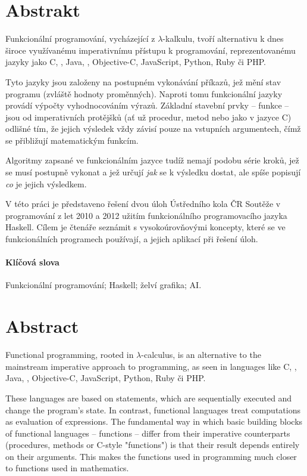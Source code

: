 \begin{adjustwidth}{1.5cm}{1.5cm}


\section*{Abstrakt}

Funkcionální programování, vycházející z $\lambda$-kalkulu, tvoří alternativu k
dnes široce využívanému imperativnímu přístupu k programování, reprezentovanému
jazyky jako C, \Cplusplus{}, Java, \Csh{}, Objective-C, JavaScript, Python, Ruby
či PHP.

Tyto jazyky jsou založeny na postupném vykonávání příkazů, jež mění stav
programu (zvláště hodnoty proměnných). Naproti tomu funkcionální jazyky provádí
výpočty vyhodnocováním výrazů. Základní stavební prvky -- funkce -- jsou od
imperativních protějšků (ať už procedur, metod nebo  jako v jazyce C)
odlišné tím, že jejich výsledek vždy závisí pouze na vstupních argumentech, čímž
se přibližují matematickým funkcím.

Algoritmy zapsané ve funkcionálním jazyce tudíž nemají podobu série kroků, jež
se musí postupně vykonat a jež určují \emph{jak} se k výsledku dostat, ale spíše
popisují \emph{co} je jejich výsledkem.

V této práci je představeno řešení dvou úloh Ústředního kola ČR Soutěže v
programování z let 2010 a 2012 užitím funkcionálního programovacího jazyka
Haskell. Cílem je čtenáře seznámit s vysokoúrovňovými koncepty, které se ve
funkcionálních programech používají, a jejich aplikací při řešení
 úloh.

\paragraph*{Klíčová slova}
Funkcionální programování; Haskell; želví grafika; AI.

\section*{Abstract}

Functional programming, rooted in $\lambda$-calculus, is an alternative to the
mainstream imperative approach to programming, as seen in languages like C,
\Cplusplus{}, Java, \Csh{}, Objective-C, JavaScript, Python, Ruby či PHP.

These languages are based on statements, which are sequentially executed and
change the program's state. In contrast, functional languages treat computations
as evaluation of expressions. The fundamental way in which basic building blocks of
functional languages -- functions -- differ from their imperative counterparts
(procedures, methods or C-style "functions") is that their result depends
entirely on their arguments. This makes the functions used in programming much
closer to functions used in mathematics.


\end{adjustwidth}
